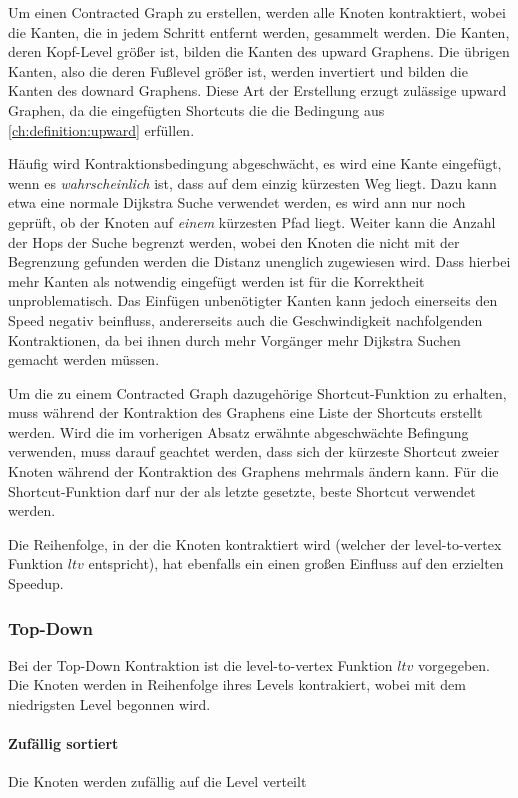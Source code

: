 Um einen Contracted Graph zu erstellen, werden alle Knoten kontraktiert, wobei die Kanten, die in jedem Schritt entfernt werden, gesammelt werden.
Die Kanten, deren Kopf-Level größer ist, bilden die Kanten des upward Graphens.
Die übrigen Kanten, also die deren Fußlevel größer ist, werden invertiert und bilden die Kanten des downard Graphens.
Diese Art der Erstellung erzugt zulässige upward Graphen, da die eingefügten Shortcuts die die Bedingung aus \autoref{ch:definition:upward} erfüllen.

Häufig wird Kontraktionsbedingung abgeschwächt, es wird eine Kante eingefügt, wenn es \emph{wahrscheinlich} ist, dass auf dem einzig kürzesten Weg liegt.
Dazu kann etwa eine normale Dijkstra Suche verwendet werden, es wird ann nur noch geprüft, ob der Knoten auf \emph{einem} kürzesten Pfad liegt.
Weiter kann die Anzahl der Hops der Suche begrenzt werden, wobei den Knoten die nicht mit der Begrenzung gefunden werden die Distanz unenglich zugewiesen wird. 
Dass hierbei mehr Kanten als notwendig eingefügt werden ist für die Korrektheit unproblematisch.
Das Einfügen unbenötigter Kanten kann jedoch einerseits den Speed negativ beinfluss, andererseits auch die Geschwindigkeit nachfolgenden Kontraktionen, da bei ihnen durch mehr Vorgänger mehr Dijkstra Suchen gemacht werden müssen.

Um die zu einem Contracted Graph dazugehörige Shortcut-Funktion zu erhalten, muss während der Kontraktion des Graphens eine Liste der Shortcuts erstellt werden.
Wird die im vorherigen Absatz erwähnte abgeschwächte Befingung verwenden, muss darauf geachtet werden, dass sich der kürzeste Shortcut zweier Knoten während der Kontraktion des Graphens mehrmals ändern kann.
Für die Shortcut-Funktion darf nur der als letzte gesetzte, beste Shortcut verwendet werden.

Die Reihenfolge, in der die Knoten kontraktiert wird (welcher der level-to-vertex Funktion ${ltv}$ entspricht), hat ebenfalls ein einen großen Einfluss auf den erzielten Speedup.

\subsubsection{Top-Down}

Bei der Top-Down Kontraktion ist die level-to-vertex Funktion ${ltv}$ vorgegeben.
Die Knoten werden in Reihenfolge ihres Levels kontrakiert, wobei mit dem niedrigsten Level begonnen wird.

\paragraph{Zufällig sortiert}
Die Knoten werden zufällig auf die Level verteilt

